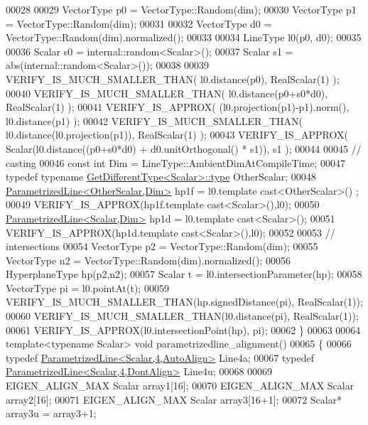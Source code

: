 \begin{DoxyCode}
00028 
00029   VectorType p0 = VectorType::Random(dim);
00030   VectorType p1 = VectorType::Random(dim);
00031 
00032   VectorType d0 = VectorType::Random(dim).normalized();
00033 
00034   LineType l0(p0, d0);
00035 
00036   Scalar s0 = internal::random<Scalar>();
00037   Scalar s1 = abs(internal::random<Scalar>());
00038 
00039   VERIFY\_IS\_MUCH\_SMALLER\_THAN( l0.distance(p0), RealScalar(1) );
00040   VERIFY\_IS\_MUCH\_SMALLER\_THAN( l0.distance(p0+s0*d0), RealScalar(1) );
00041   VERIFY\_IS\_APPROX( (l0.projection(p1)-p1).norm(), l0.distance(p1) );
00042   VERIFY\_IS\_MUCH\_SMALLER\_THAN( l0.distance(l0.projection(p1)), RealScalar(1) );
00043   VERIFY\_IS\_APPROX( Scalar(l0.distance((p0+s0*d0) + d0.unitOrthogonal() * s1)), s1 );
00044 
00045   \textcolor{comment}{// casting}
00046   \textcolor{keyword}{const} \textcolor{keywordtype}{int} Dim = LineType::AmbientDimAtCompileTime;
00047   \textcolor{keyword}{typedef} \textcolor{keyword}{typename} \hyperlink{struct_get_different_type}{GetDifferentType<Scalar>::type} OtherScalar;
00048   \hyperlink{group___geometry___module_class_eigen_1_1_parametrized_line}{ParametrizedLine<OtherScalar,Dim>} hp1f = l0.template cast<OtherScalar>()
      ;
00049   VERIFY\_IS\_APPROX(hp1f.template cast<Scalar>(),l0);
00050   \hyperlink{group___geometry___module_class_eigen_1_1_parametrized_line}{ParametrizedLine<Scalar,Dim>} hp1d = l0.template cast<Scalar>();
00051   VERIFY\_IS\_APPROX(hp1d.template cast<Scalar>(),l0);
00052 
00053   \textcolor{comment}{// intersections}
00054   VectorType p2 = VectorType::Random(dim);
00055   VectorType n2 = VectorType::Random(dim).normalized();
00056   HyperplaneType hp(p2,n2);
00057   Scalar t = l0.intersectionParameter(hp);
00058   VectorType pi = l0.pointAt(t);
00059   VERIFY\_IS\_MUCH\_SMALLER\_THAN(hp.signedDistance(pi), RealScalar(1));
00060   VERIFY\_IS\_MUCH\_SMALLER\_THAN(l0.distance(pi), RealScalar(1));
00061   VERIFY\_IS\_APPROX(l0.intersectionPoint(hp), pi);
00062 \}
00063 
00064 \textcolor{keyword}{template}<\textcolor{keyword}{typename} Scalar> \textcolor{keywordtype}{void} parametrizedline\_alignment()
00065 \{
00066   \textcolor{keyword}{typedef} \hyperlink{group___geometry___module_class_eigen_1_1_parametrized_line}{ParametrizedLine<Scalar,4,AutoAlign>} Line4a;
00067   \textcolor{keyword}{typedef} \hyperlink{group___geometry___module_class_eigen_1_1_parametrized_line}{ParametrizedLine<Scalar,4,DontAlign>} Line4u;
00068 
00069   EIGEN\_ALIGN\_MAX Scalar array1[16];
00070   EIGEN\_ALIGN\_MAX Scalar array2[16];
00071   EIGEN\_ALIGN\_MAX Scalar array3[16+1];
00072   Scalar* array3u = array3+1;

\end{DoxyCode}
